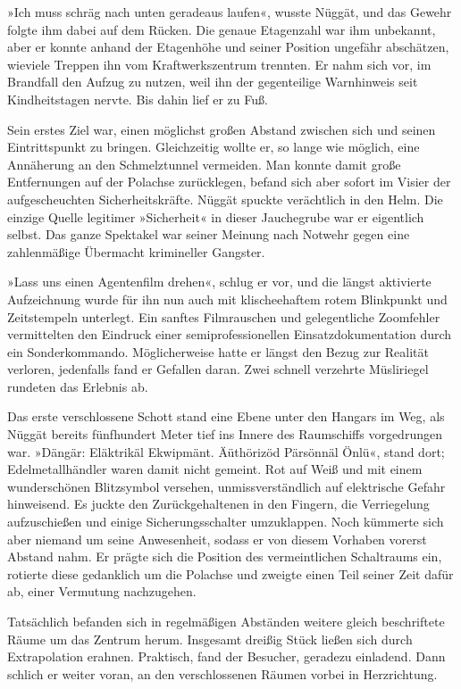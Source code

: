 »Ich muss schräg nach unten geradeaus laufen«, wusste Nüggät, und das Gewehr folgte ihm dabei auf dem Rücken. Die genaue Etagenzahl war ihm unbekannt, aber er konnte anhand der Etagenhöhe und seiner Position ungefähr abschätzen, wieviele Treppen ihn vom Kraftwerkszentrum trennten. Er nahm sich vor, im Brandfall den Aufzug zu nutzen, weil ihn der gegenteilige Warnhinweis seit Kindheitstagen nervte. Bis dahin lief er zu Fuß.

Sein erstes Ziel war, einen möglichst großen Abstand zwischen sich und seinen Eintrittspunkt zu bringen. Gleichzeitig wollte er, so lange wie möglich, eine Annäherung an den Schmelztunnel vermeiden. Man konnte damit große Entfernungen auf der Polachse zurücklegen, befand sich aber sofort im Visier der aufgescheuchten Sicherheitskräfte. Nüggät spuckte verächtlich in den Helm. Die einzige Quelle legitimer »Sicherheit« in dieser Jauchegrube war er eigentlich selbst. Das ganze Spektakel war seiner Meinung nach Notwehr gegen eine zahlenmäßige Übermacht krimineller Gangster.

»Lass uns einen Agentenfilm drehen«, schlug er vor, und die längst aktivierte Aufzeichnung wurde für ihn nun auch mit klischeehaftem rotem Blinkpunkt und Zeitstempeln unterlegt. Ein sanftes Filmrauschen und gelegentliche Zoomfehler vermittelten den Eindruck einer semiprofessionellen Einsatzdokumentation durch ein Sonderkommando. Möglicherweise hatte er längst den Bezug zur Realität verloren, jedenfalls fand er Gefallen daran. Zwei schnell verzehrte Müsliriegel rundeten das Erlebnis ab.

Das erste verschlossene Schott stand eine Ebene unter den Hangars im Weg, als Nüggät bereits fünfhundert Meter tief ins Innere des Raumschiffs vorgedrungen war. »Dängär: Eläktrikäl Ekwipmänt. Äüthörizöd Pärsönnäl Önlü«, stand dort; Edelmetallhändler waren damit nicht gemeint. Rot auf Weiß und mit einem wunderschönen Blitzsymbol versehen, unmissverständlich auf elektrische Gefahr hinweisend. Es juckte den Zurückgehaltenen in den Fingern, die Verriegelung aufzuschießen und einige Sicherungsschalter umzuklappen. Noch kümmerte sich aber niemand um seine Anwesenheit, sodass er von diesem Vorhaben vorerst Abstand nahm. Er prägte sich die Position des vermeintlichen Schaltraums ein, rotierte diese gedanklich um die Polachse und zweigte einen Teil seiner Zeit dafür ab, einer Vermutung nachzugehen.

Tatsächlich befanden sich in regelmäßigen Abständen weitere gleich beschriftete Räume um das Zentrum herum. Insgesamt dreißig Stück ließen sich durch Extrapolation erahnen. Praktisch, fand der Besucher, geradezu einladend. Dann schlich er weiter voran, an den verschlossenen Räumen vorbei in Herzrichtung.

